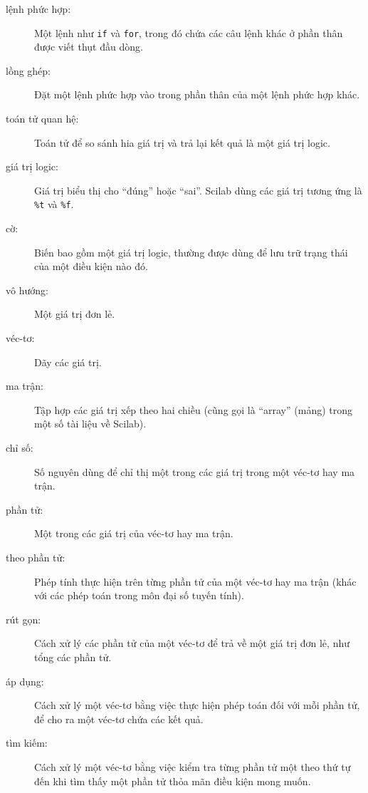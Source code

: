 \documentclass[12pt]{book}
\begin{document}
\begin{description}

\item[lệnh phức hợp:] Một lệnh như {\tt if} và {\tt for}, trong đó
chứa các câu lệnh khác ở phần thân được viết thụt đầu dòng.

\item[lồng ghép:] Đặt một lệnh phức hợp vào trong phần thân của một
lệnh phức hợp khác.

\item[toán tử quan hệ:] Toán tử để so sánh hia giá trị và trả lại
kết quả là một giá trị logic.

\item[giá trị logic:] Giá trị biểu thị cho ``đúng'' hoặc
``sai''.  Scilab dùng các giá trị tương ứng là \texttt{\%t} và \texttt{\%f}.

\item[cờ:] Biến bao gồm một giá trị logic, thường được dùng để lưu trữ
trạng thái của một điều kiện nào đó.

\item[vô hướng:] Một giá trị đơn lẻ.

\item[véc-tơ:] Dãy các giá trị.

\item[ma trận:] Tập hợp các giá trị xếp theo hai chiều (cũng gọi là
``array'' (mảng) trong một số tài liệu về Scilab).

\item[chỉ số:] Số nguyên dùng để chỉ thị một trong các giá trị trong
một véc-tơ hay ma trận.

\item[phần tử:] Một trong các giá trị của véc-tơ hay ma trận.

\item[theo phần tử:] Phép tính thực hiện trên từng phần tử của một
véc-tơ hay ma trận (khác với các phép toán trong môn đại số tuyến tính).

\item[rút gọn:] Cách xử lý các phần tử của một véc-tơ để trả về một
giá trị đơn lẻ, như tổng các phần tử.

\item[áp dụng:] Cách xử lý một véc-tơ bằng việc thực hiện phép
toán đối với mỗi phần tử, để cho ra một véc-tơ chứa các kết quả.

\item[tìm kiếm:] Cách xử lý một véc-tơ bằng việc kiểm tra từng phần tử
một theo thứ tự đến khi tìm thấy một phần tử thỏa mãn điều kiện mong muốn.

\end{description}
\end{document}
